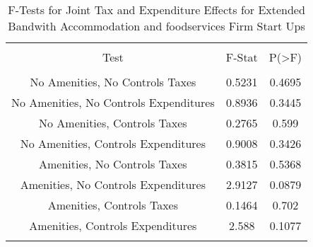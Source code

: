 
\begin{table}[!htbp] \centering 
  \caption{F-Tests for Joint Tax and Expenditure Effects for Extended Bandwith Accommodation and foodservices Firm Start Ups} 
  \label{72Ftests} 
\begin{tabular}{@{\extracolsep{5pt}} ccc} 
\\[-1.8ex]\hline 
\hline \\[-1.8ex] 
Test & F-Stat & P(\textgreater F) \\ 
\hline \\[-1.8ex] 
No Amenities, No Controls Taxes & 0.5231 & 0.4695 \\ 
No Amenities, No Controls Expenditures & 0.8936 & 0.3445 \\ 
No Amenities, Controls Taxes & 0.2765 & 0.599 \\ 
No Amenities, Controls Expenditures & 0.9008 & 0.3426 \\ 
Amenities, No Controls Taxes & 0.3815 & 0.5368 \\ 
Amenities, No Controls Expenditures & 2.9127 & 0.0879 \\ 
Amenities, Controls Taxes & 0.1464 & 0.702 \\ 
Amenities, Controls Expenditures & 2.588 & 0.1077 \\ 
\hline \\[-1.8ex] 
\end{tabular} 
\end{table} 

